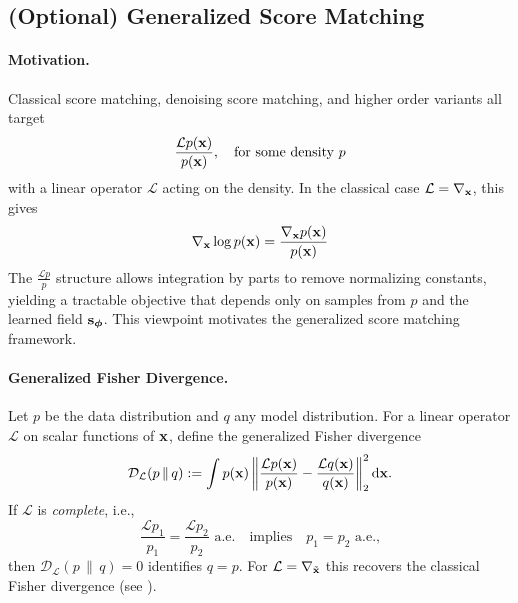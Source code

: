\subsection{(Optional) Generalized Score Matching}


\paragraph{Motivation.}
Classical score matching, denoising score matching, and higher order variants all target
\[
\frac{\mathcal L p({\mathbf{x}})}{p({\mathbf{x}})},\quad\text{for some density } p
\]
with a linear operator $\mathcal L$ acting on the density. 
In the classical case $\mathcal L=\nabla_{{\mathbf{x}}}$, this gives 
\[
\nabla_{{\mathbf{x}}}\log p({\mathbf{x}}) = \frac{\nabla_{{\mathbf{x}}} p({\mathbf{x}})}{p({\mathbf{x}})}
\]
The $\frac{\mathcal L p}{p}$ structure allows integration by parts to remove normalizing constants, yielding a tractable objective that depends only on samples from $p$ and the learned field ${\mathbf{s}}_{\bm{\phi}}$.
This viewpoint motivates the generalized score matching framework.

\paragraph{Generalized Fisher Divergence.}
Let $p$ be the data distribution and $q$ any model distribution.
For a linear operator $\mathcal L$ on scalar functions of ${\mathbf{x}}$, define the generalized Fisher divergence
\[
\mathcal D_{\mathcal L}(p \,\|\, q)
:= \int p({\mathbf{x}}) 
\left\|
\frac{\mathcal L p({\mathbf{x}})}{p({\mathbf{x}})}
-
\frac{\mathcal L q({\mathbf{x}})}{q({\mathbf{x}})}
\right\|_2^2 \mathop{}\!\mathrm{d} {\mathbf{x}}.
\]
If $\mathcal L$ is \emph{complete}, i.e., 
\[
\frac{\mathcal L p_1}{p_1}=\frac{\mathcal L p_2}{p_2} \text{ a.e.}\quad \text{implies}\quad p_1=p_2 \text{ a.e.,}
\]
then $\mathcal D_{\mathcal L}(p \,\|\, q)=0$ identifies $q=p$.
For $\mathcal L=\nabla_{\tilde{{\mathbf{x}}}}$ this recovers the classical Fisher divergence (see ).

